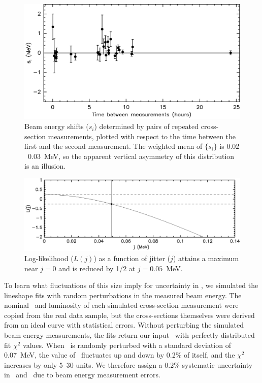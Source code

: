 \documentclass{cornell}
\begin{document}
\begin{figure}[p]
  \begin{center}
    \includegraphics[width=\linewidth]{miscalhours}
  \end{center}
  \caption[Calibration shifts from repeated cross-section
  measurements]{\label{miscalhours} Beam energy shifts ($s_i$)
  determined by pairs of repeated cross-section measurements, plotted
  with respect to the time between the first and the second
  measurement.  The weighted mean of $\{s_i\}$ is 0.02 \PM\ 0.03~MeV,
  so the apparent vertical asymmetry of this distribution is an
  illusion.}
\end{figure}

\begin{figure}[p]
  \begin{center}
    \includegraphics[width=\linewidth]{energylj}
  \end{center}
  \caption[Log-likelihood of beam energy jitter]{\label{energylj}
  Log-likelihood ($L(j)$) as a function of jitter ($j$) attains a
  maximum near $j=0$ and is reduced by 1/2 at $j=0.05$~MeV.}
\end{figure}

To learn what fluctuations of this size imply for uncertainty in
\geehadtot, we simulated the lineshape fits with random perturbations
in the measured beam energy.  The nominal \ecm\ and luminosity of each
simulated cross-section measurement were copied from the real data
sample, but the cross-sections themselves were derived from an ideal
curve with statistical errors.  Without perturbing the simulated beam
energy measurements, the fits return our input \geehadtot\ with
perfectly-distributed fit $\chi^2$ values.  When \ecm\ is randomly
perturbed with a standard deviation of 0.07~MeV, the value of
\geehadtot\ fluctuates up and down by 0.2\% of itself, and the
$\chi^2$ increases by only 5--30 units.  \label{pag:notjitter} We
therefore assign a 0.2\% systematic uncertainty in \geehadtot\ and
\gee\ due to beam energy measurement errors.
\end{document}
